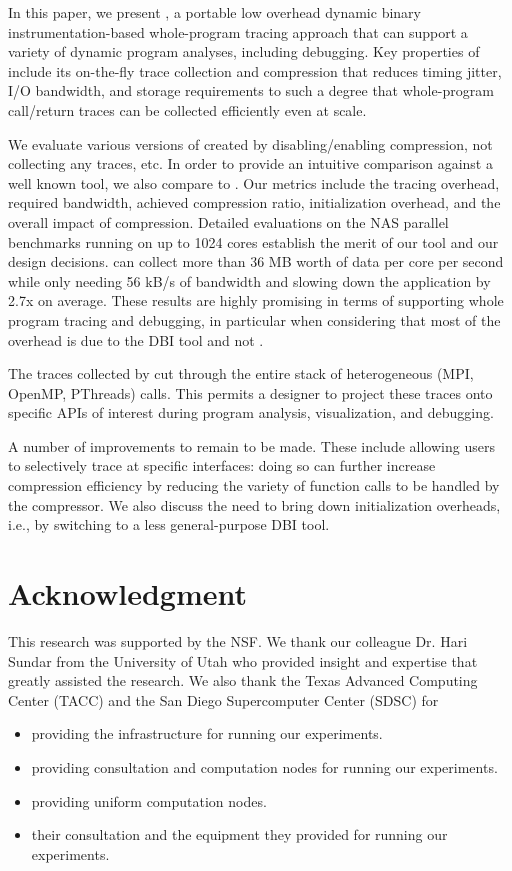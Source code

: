 
In this paper, 
we present \parlot, a portable low overhead dynamic
binary instrumentation-based
whole-program
tracing approach that can support a variety of 
dynamic program analyses, including debugging.
%
Key properties of \parlot include its on-the-fly trace collection and
compression that reduces timing jitter, I/O bandwidth, and storage requirements to such a degree that whole-program call/return traces can be collected efficiently even at scale. 

We evaluate various versions of \parlot
created by disabling/enabling compression, not collecting any traces, etc.
%
In order to provide an intuitive comparison against a well known tool,
we also compare \parlot to \callgrind.
%
Our metrics include the tracing overhead, required bandwidth, achieved compression ratio, initialization overhead, and the 
overall impact of compression.
%
Detailed evaluations on the NAS parallel benchmarks running on
up to 1024 cores establish the merit of our tool and our design decisions. 
\parlot can collect more than 36 MB worth of data per core per second while 
only needing 56 kB/s of bandwidth and slowing down the 
application by 2.7x on average.
%
These results are highly promising in terms of supporting 
whole program tracing and debugging, in particular when considering that most of the overhead is due to the DBI tool and not \parlot.


The traces collected by \parlot cut through the entire stack of heterogeneous
(MPI, OpenMP, PThreads) calls. 
%
This permits a designer to project these traces onto specific
APIs of interest during program analysis, visualization, and debugging.
%


A number of improvements to \parlot remain to be made.
%
These include allowing users to selectively trace at specific
interfaces: doing so can further increase compression efficiency
by reducing the variety of function calls to be handled by
the compressor.
%
We also discuss the need to bring down initialization overheads, i.e.,
by switching to a less general-purpose DBI tool.
%



\section*{Acknowledgment}

This research was supported by the NSF. We thank our colleague Dr. Hari Sundar from the University of Utah who provided insight and expertise that greatly assisted the research. We also thank the Texas Advanced Computing Center (TACC) and the San Diego Supercomputer Center (SDSC) for 

\begin{itemize}
\item providing the infrastructure for running our experiments.
\item providing consultation and computation nodes for running our experiments.
\item providing uniform computation nodes.
\item their consultation and the equipment they provided for running our experiments.
\end{itemize}

 
